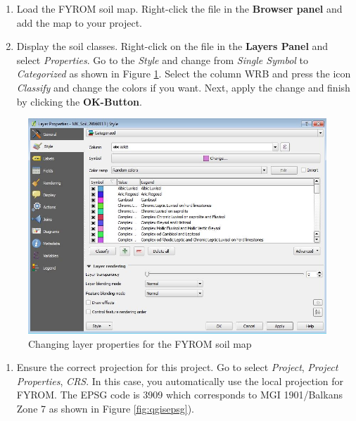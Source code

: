 \documentclass[10pt,b5paper,]{book}
\providecommand{\tightlist}{%
  \setlength{\itemsep}{0pt}\setlength{\parskip}{0pt}}
\theoremstyle{definition}
\theoremstyle{definition}
\theoremstyle{definition}
\theoremstyle{remark}
\begin{document}
\begin{enumerate}
\def\labelenumi{\arabic{enumi}.}
\setcounter{enumi}{3}
\tightlist
\item
  Load the FYROM soil map. Right-click the file in the \textbf{Browser
  panel} and add the map to your project.
\item
  Display the soil classes. Right-click on the file in the
  \textbf{Layers Panel} and select \emph{Properties}. Go to the
  \emph{Style} and change from \emph{Single Symbol} to
  \emph{Categorized} as shown in Figure \ref{fig:layerprop}. Select the
  column WRB and press the icon \emph{Classify} and change the colors if
  you want. Next, apply the change and finish by clicking the
  \textbf{OK-Button}.
\end{enumerate}

\begin{figure}

{\centering \includegraphics[width=0.8\linewidth]{images/Conv_upscaling2} 

}

\caption{Changing layer properties for the FYROM soil map}\label{fig:layerprop}
\end{figure}

\begin{enumerate}
\def\labelenumi{\arabic{enumi}.}
\setcounter{enumi}{5}
\tightlist
\item
  Ensure the correct projection for this project. Go to select
  \emph{Project}, \emph{Project Properties}, \emph{CRS}. In this case,
  you automatically use the local projection for FYROM. The EPSG code is
  3909 which corresponds to MGI 1901/Balkans Zone 7 as shown in Figure
  \ref{fig:qgisepsg}).
\end{enumerate}
\end{document}
